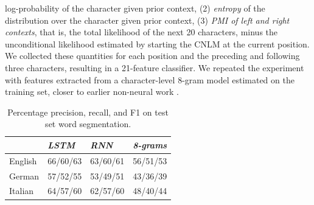 log-probability of the character given prior context, (2)
\emph{entropy} of the distribution over the character given prior
context, (3) \emph{PMI of left and right contexts}, that is, the total
 likelihood of the next 20 characters, minus the unconditional
 likelihood estimated by starting the CNLM at the current position. %
 We collected these quantities for each position and the preceding
 and following three characters, resulting in a 21-feature classifier. %
We repeated the  experiment with features extracted from a
character-level 8-gram model estimated on the training set, closer to
 earlier non-neural work
\cite{saffran-word-1996, feng-accessor-2004}.


\begin{table}[t]
	\small
  \begin{center}
    \begin{tabular}{l|l|l|l}
      \multicolumn{1}{c|}{}&\emph{LSTM}&\emph{RNN}&\emph{8-grams}\\
      \hline
      English & 66/60/63 &   63/60/61 & 56/51/53    \\ %
      German &  57/52/55 &  53/49/51 & 43/36/39   \\ %
      Italian &  64/57/60 & 62/57/60  & 48/40/44    \\ %
    \end{tabular}
  \end{center}
  \caption{\label{tab:segmentation-results} Percentage precision, recall, and F1 on test set word segmentation.}
\end{table}


